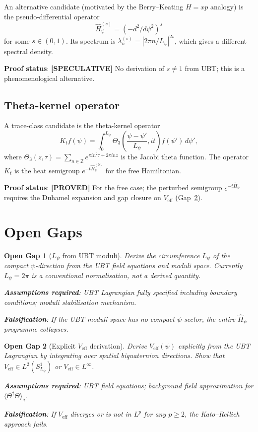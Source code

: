 \documentclass[11pt,a4paper]{article}
\newtheorem{gap}{Open Gap}
\newcommand{\proved}[1]{\textbf{[PROVED]} #1}
\newcommand{\speculative}[1]{\textbf{[SPECULATIVE]} #1}
\begin{document}
An alternative candidate (motivated by the Berry--Keating $H = xp$ analogy)
is the pseudo-differential operator
\[
  \hat{H}^{(s)}_\psi = (-d^2/d\psi^2)^s
\]
for some $s \in (0,1)$.  Its spectrum is $\lambda_n^{(s)} = |2\pi n/L_\psi|^{2s}$,
which gives a different spectral density.

\textbf{Proof status}: \speculative{No derivation of $s \neq 1$ from UBT;
this is a phenomenological alternative.}

\subsection{Theta-kernel operator}

A trace-class candidate is the theta-kernel operator
\[
  K_t f(\psi)
  = \int_0^{L_\psi} \Theta_3\!\left(\frac{\psi-\psi'}{L_\psi}, it\right)
    f(\psi')\, d\psi',
\]
where $\Theta_3(z,\tau) = \sum_{n\in\mathbb{Z}} e^{\pi i n^2 \tau + 2\pi i nz}$
is the Jacobi theta function.  The operator $K_t$ is the heat semigroup
$e^{-t\hat{H}_\psi^{(0)}}$ for the free Hamiltonian.

\textbf{Proof status}: \proved{For the free case; the perturbed semigroup
$e^{-t\hat{H}_\psi}$ requires the Duhamel expansion and gap closure on
$V_\mathrm{eff}$ (Gap~\ref{gap:Veff}).}

\section{Open Gaps}

\begin{gap}[$L_\psi$ from UBT moduli]
  \label{gap:Lpsi}
  Derive the circumference $L_\psi$ of the compact $\psi$-direction from the
  UBT field equations and moduli space.  Currently $L_\psi = 2\pi$ is a
  conventional normalisation, not a derived quantity.

  \textbf{Assumptions required}: UBT Lagrangian fully specified including
  boundary conditions; moduli stabilisation mechanism.

  \textbf{Falsification}: If the UBT moduli space has no compact $\psi$-sector,
  the entire $\hat{H}_\psi$ programme collapses.
\end{gap}

\begin{gap}[Explicit $V_\mathrm{eff}$ derivation]
  \label{gap:Veff}
  Derive $V_\mathrm{eff}(\psi)$ explicitly from the UBT Lagrangian by
  integrating over spatial biquaternion directions.  Show that
  $V_\mathrm{eff} \in L^2(S^1_{L_\psi})$ or $V_\mathrm{eff} \in L^\infty$.

  \textbf{Assumptions required}: UBT field equations; background field
  approximation for $\langle\Theta^\dagger\Theta\rangle_q$.

  \textbf{Falsification}: If $V_\mathrm{eff}$ diverges or is not in
  $L^p$ for any $p \geq 2$, the Kato--Rellich approach fails.
\end{gap}
\end{document}
